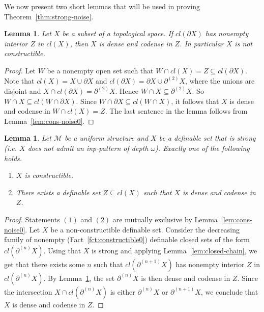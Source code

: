 \documentclass[12pt]{article}
\newcommand{\Mm}{\mathcal{M}}
\newcommand{\partn}[1]{\partial^{(#1)}}
\newtheorem{lemma}[theorem]{Lemma}
\theoremstyle{definition}
\theoremstyle{remark}
\begin{document}
We now present two short lemmas that will be used in proving Theorem~\ref{thm:strong-noise}.

\begin{lemma}\label{lem:fr-interior}
Let $X$ be a subset of a topological space. If $cl(\partial X)$ has nonempty interior $Z$ in $cl(X)$, then $X$ is dense and codense in $Z$. In particular $X$ is not constructible.  
\end{lemma}
\begin{proof}
Let $W$ be a nonempty open set such that $W\cap cl(X) = Z \subseteq cl(\partial X)$. Note that $cl(X)= X \cup \partial X$ and $cl(\partial X)=\partial X \cup \partn{2}X$, where the unions are disjoint and $X\cap cl(\partial X)=\partn{2}X$. Hence $W\cap X \subseteq \partn{2}X$. So $W\cap X \subseteq cl(W\cap \partial X)$. Since $W\cap \partial X \subseteq cl(W\cap X)$, it follows that $X$ is dense and codense in $W\cap cl(X) = Z$. The last sentence in the lemma follows from Lemma~\ref{lem:cons-noise0}.
\end{proof}

\begin{lemma}\label{lem:strong-noise}
Let $\Mm$ be a uniform structure and $X$ be a definable set that is strong (i.e. $X$ does not admit an inp-pattern of depth $\omega$). Exactly one of the following holds.
\begin{enumerate}
    \item $X$ is constructible. 
    \item There exists a definable set $Z\subseteq cl(X)$ such that $X$ is dense and codense in $Z$. 
\end{enumerate}
\end{lemma}
\begin{proof}
Statements $(1)$ and $(2)$ are mutually exclusive by Lemma~\ref{lem:cons-noise0}. Let $X$ be a non-constructible definable set. Consider the decreasing family of nonempty (Fact~\ref{fct:constructible0}) definable closed sets of the form $cl(\partn{n}X)$. Using that $X$ is strong and applying Lemma~\ref{lem:closed-chain}, we get that there exists some $n$ such that $cl(\partn{n+1}X)$ has nonempty interior $Z$ in $cl(\partn{n}X)$. By Lemma~\ref{lem:fr-interior}, the set $\partn{n}X$ is then dense and codense in $Z$. Since the intersection $X\cap cl(\partn{n}X)$ is either $\partn{n}X$ or $\partn{n+1}X$,  we conclude that $X$ is dense and codense in $Z$.
\end{proof}

\end{document}
